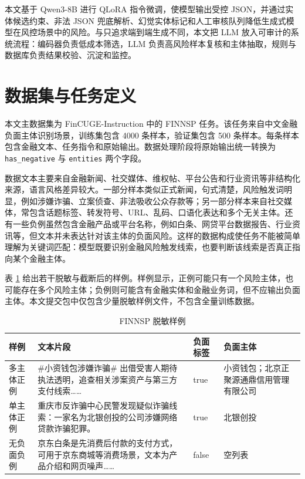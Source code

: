\documentclass[UTF8,a4paper,12pt]{ctexart}
\begin{document}
本文基于 Qwen3-8B 进行 QLoRA 指令微调，使模型输出受控 JSON，并通过实体候选约束、非法 JSON 兜底解析、幻觉实体标记和人工审核队列降低生成式模型在风控场景中的风险。与只追求端到端生成不同，本文把 LLM 放入可审计的系统流程：编码器负责低成本筛选，LLM 负责高风险样本复核和主体抽取，规则与数据库负责结果校验、沉淀和监控。

\section{数据集与任务定义}

本文主数据集为 FinCUGE-Instruction 中的 FINNSP 任务。该任务来自中文金融负面主体识别场景，训练集包含 4000 条样本，验证集包含 500 条样本。每条样本包含金融文本、任务指令和原始输出。数据处理阶段将原始输出统一转换为 \texttt{has\_negative} 与 \texttt{entities} 两个字段。

数据文本主要来自金融新闻、社交媒体、维权帖、平台公告和行业资讯等非结构化来源，语言风格差异较大。一部分样本类似正式新闻，句式清楚，风险触发词明显，例如涉嫌诈骗、立案侦查、非法吸收公众存款等；另一部分样本来自社交媒体，常包含话题标签、转发符号、URL、乱码、口语化表达和多个无关主体。还有一些负例虽然包含金融产品或平台名称，例如白条、网贷平台数据报告、行业资讯等，但文本并未表达针对该主体的负面风险。这样的数据构成使任务不能被简单理解为关键词匹配：模型既要识别金融风险触发线索，也要判断该线索是否真正指向某个金融主体。

表 \ref{tab:data_examples} 给出若干脱敏与截断后的样例。样例显示，正例可能只有一个风险主体，也可能存在多个风险主体；负例则可能含有金融实体和金融业务词，但不应输出负面主体。本文提交包中仅包含少量脱敏样例文件，不包含全量训练数据。

\begin{table}[H]
\centering
\caption{FINNSP 脱敏样例}
\label{tab:data_examples}
\scriptsize
\setlength{\tabcolsep}{3pt}
\renewcommand{\arraystretch}{1.15}
\begin{tabular}{>{\raggedright\arraybackslash}p{}>{\raggedright\arraybackslash}p{}>{\centering\arraybackslash}p{}>{\raggedright\arraybackslash}p{}}
\toprule
样例 & 文本片段 & 负面标签 & 负面主体 \\
\midrule
多主体正例 & \#小资钱包涉嫌诈骗\# 出借受害人期待执法透明，追查相关涉案资产与第三方支付线索…… & true & 小资钱包；北京正聚源通鼎信用管理有限公司 \\
单主体正例 & 重庆市反诈骗中心民警发现疑似诈骗线索：一家名为北银创投的公司涉嫌网络贷款诈骗犯罪。 & true & 北银创投 \\
无负面负例 & 京东白条是先消费后付款的支付方式，可用于京东商城等消费场景，文本为产品介绍和网页噪声…… & false & 空列表 \\
\bottomrule
\end{tabular}
\end{table}
\end{document}
